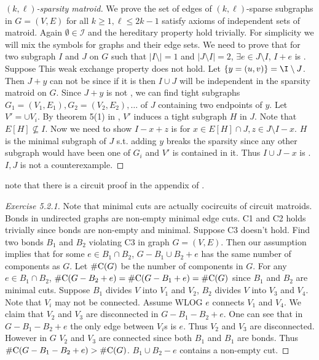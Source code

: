 \begin{proof}[$(k,\ell)$-sparsity matroid]
We prove the set of edges of $(k,\ell)$-sparse subgraphs in $G=(V,E)$ for all $k\geq 1, \ell \leq 2k-1$ satisfy axioms of independent sets of matroid. Again $\emptyset \in \mathcal I$ and the hereditary property hold trivially. For simplicity we will mix the symbols for graphs and their edge sets. We need to prove that for two \klsparse{} subgraph $I$ and $J$ on $G$ such that $|I\setminus|=1$ and $|J\setminus I|=2$, $\exists e\in J\setminus I$, $I+e$ is \klsparse{}. Suppose This weak exchange property does not hold. Let $\{y=(u,v)\}=\I\setminus J$. Then $J+y$ can not be \klsparse{} since if it is then $I\cup J$ will be independent in the sparsity matroid on $G$. Since $J+y$ is not \klsparse{}, we can find tight subgraphs $G_1=(V_1,E_1),G_2=(V_2,E_2),\ldots$ of $J$ containing two endpoints of $y$. Let $V'=\cup V_i$. By theorem 5(1) in \cite{lee_pebble_2008}, $V'$ induces a tight subgraph $H$ in $J$. Note that $E[H]\not \subseteq I$. Now we need to show $I-x+z$ is \klsparse{} for $x\in E[H]\cap J,z\in J\setminus I-x$. $H$ is the minimal subgraph of $J$ s.t. adding $y$ breaks the sparsity since any other subgraph would have been one of $G_i$ and $V'$ is contained in it. Thus $I\cup J-x$ is \klsparse{}. $I, J$ is not a counterexample.
\end{proof}

note that there is a circuit proof in the appendix of \cite{Whiteley_matroids_1996}.

\begin{proof}[Exercise 5.2.1]
    Note that minimal cuts are actually cocircuits of circuit matroids.
    Bonds in undirected graphs are non-empty minimal edge cuts. C1 and C2 holds trivially since bonds are non-empty and minimal. Suppose C3 doesn't hold. Find two bonds $B_1$ and $B_2$ violating C3 in graph $G=(V,E)$. Then our assumption implies that for some $e\in B_1\cap B_2$, $G-B_1\cup B_2 + e$ has the same number of components as $G$. Let $\operatorname{\#C}(G)$ be the number of components in $G$. For any $e\in B_1\cap B_2$, $\operatorname{\#C}(G-B_2+e)=\operatorname{\#C}(G-B_1+e)=\operatorname{\#C}(G)$ since $B_1$ and $B_2$ are minimal cuts. Suppose $B_1$ divides $V$ into $V_1$ and $V_2$, $B_2$ divides $V$ into $V_3$ and $V_4$. Note that $V_i$ may not be connected. Assume WLOG $e$ connects $V_1$ and $V_4$. We claim that $V_2$ and $V_3$ are disconnected in $G-B_1-B_2+e$. One can see that in $G-B_1-B_2+e$ the only edge between $V_i$s is $e$. Thus $V_2$ and $V_3$ are disconnected. However in $G$ $V_2$ and $V_3$ are connected since both $B_1$ and $B_1$ are bonds. Thus $\operatorname{\#C}(G-B_1-B_2+e)> \operatorname{\#C}(G)$. $B_1\cup B_2-e$ contains a non-empty cut.
\end{proof}


